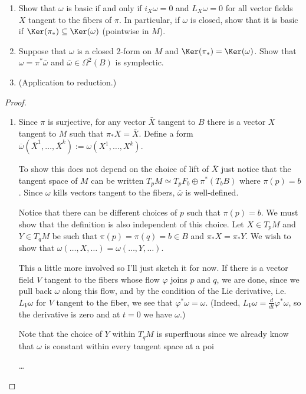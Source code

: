\documentclass{book}
\begin{document}
\begin{exercise}
\label{exercise-basic-forms-characterization}
\begin{enumerate}
\item Show that $\omega$ is basic if and only
if
$i_X \omega=0$ and $L_X\omega=0$
for all vector fields $X$ tangent
to the fibers of $\pi$.
In particular, if $\omega$ is closed,
show that it is basic if
$\Ker (\pi_*) \subseteq \Ker(\omega)$
(pointwise in $M$).

\item Suppose that $\omega$ is a closed
2-form on $M$ and $\Ker(\pi_*)=\Ker(\omega)$.
Show that $\omega=\pi^*\overline{\omega}$
and $\overline{\omega}\in\Omega^2(B)$
is symplectic.

\item (Application to reduction.)
\end{enumerate}
\end{exercise}

\begin{proof}
\begin{enumerate}
\item Since $\pi$ is surjective, for any
vector $\bar{X}$ tangent to $B$ there is
a vector $X$ tangent to $M$ such that
$\pi_*X=\bar{X}$.
Define a form
$\overline{\omega}(\bar{X}^1,…,\bar{X}^k):=
\omega(X^1,…,X^k)$.

To show this does not depend on the choice of
lift of $\bar{X}$
just notice that the tangent space of $M$ can
be written
$T_pM \simeq T_pF_b \oplus \pi^*(T_bB)$ where
$\pi(p)=b$.
Since $\omega$ kills vectors tangent to the
fibers,
$\overline{\omega}$ is well-defined.

Notice that there can be different choices of
$p$ such that
$\pi(p)=b$. We must show that the definition
is also
independent of this choice.
Let $X \in T_pM$ and $Y \in T_qM$ be such
that
$\pi(p)=\pi(q)=b \in B$ and $\pi_*X=\pi_*Y$.
We wish to show that
$\omega(…,X,…)=\omega(…,Y,…)$.

This a little more involved so I'll just
sketch it for now.
If there is a vector field $V$ tangent to the
fibers
whose flow $\varphi$ joins $p$ and $q$, we
are done,
since we pull back $\omega$ along this flow,
and by the condition of the Lie derivative,
i.e. $L_V\omega$ for $V$
tangent to the fiber, we see that
$\varphi^*\omega=\omega$.
(Indeed,
$L_V\omega=\frac{d}{dt}\varphi^*\omega$,
so the derivative is zero and at $t=0$ we
have $\omega$.)

Note that the choice of $Y$ within $T_qM$
is superfluous since we already know that
$\omega$
is constant within every tangent space at a
poi

…
\end{enumerate}
\end{proof}
\end{document}
